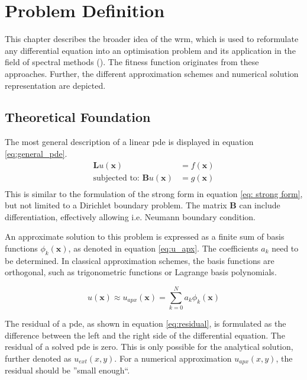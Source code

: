 \documentclass[./\jobname.tex]{subfiles}
\begin{document}
\chapter{Problem Definition}
This chapter describes the broader idea of the \gls{wrm}, which is used to reformulate any differential equation into an optimisation problem and its application in the field of spectral methods (\cite{shen_spectral_2011}). The fitness function originates from these approaches. Further, the different approximation schemes and numerical solution representation are depicted. 

\section{Theoretical Foundation}
\label{chap:opt_problem}

The most general description of a linear \gls{pde} is displayed in equation \eqref{eq:general_pde}.
\begin{equation}
\label{eq:general_pde}
\begin{split}
\mathbf{L}u(\mathbf{x}) & = f(\mathbf{x}) \\
\text{subjected to: }\mathbf{B}u(\mathbf{x}) & = g(\mathbf{x}) \\
\end{split}
\end{equation}
This is similar to the formulation of the strong form in equation \eqref{eq: strong form}, but not limited to a Dirichlet boundary problem. The matrix $\mathbf{B}$ can include differentiation, effectively allowing i.e. Neumann boundary condition. 

An approximate solution to this problem is expressed as a finite sum of basis functions $\phi_k(\mathbf{x})$, as denoted in equation \eqref{eq:u_apx}. The coefficients $a_k$ need to be determined. In classical approximation schemes, the basis functions are orthogonal, such as trigonometric functions or Lagrange basis polynomials. 

\begin{equation}
\label{eq:u_apx}
u(\mathbf{x}) \approx u_{apx}(\mathbf{x}) = \sum_{k=0}^{N} a_k \phi_k (\mathbf{x})
\end{equation}

The residual of a \gls{pde}, as shown in equation \eqref{eq:residual}, is formulated as the difference between the left and the right side of the differential equation. The residual of a solved \gls{pde} is zero. This is only possible for the analytical solution, further denoted as $u_{ext}(x,y)$. For a numerical approximation $u_{apx}(x,y)$, the residual should be ''small enough``. 
\end{document}
